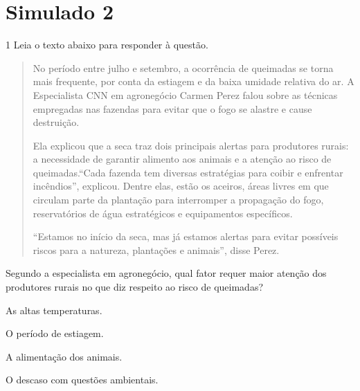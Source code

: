 \pagebreak

\section*{Simulado 2}

\num{1} Leia o texto abaixo para responder à questão.

\begin{quote}

No período entre julho e setembro, a ocorrência de queimadas se torna
mais frequente, por conta da estiagem e da baixa umidade relativa do ar.
A Especialista CNN em agronegócio Carmen Perez falou sobre as técnicas
empregadas nas fazendas para evitar que o fogo se alastre e cause
destruição.

Ela explicou que a seca traz dois principais alertas para produtores
rurais: a necessidade de garantir alimento aos animais e a atenção ao
risco de queimadas.``Cada fazenda tem diversas estratégias para coibir e
enfrentar incêndios'', explicou. Dentre elas, estão os aceiros, áreas
livres em que circulam parte da plantação para interromper a propagação do
fogo, reservatórios de água estratégicos e equipamentos específicos.

``Estamos no início da seca, mas já estamos alertas para evitar
possíveis riscos para a natureza, plantações e animais'', disse Perez.

\end{quote}


Segundo a especialista em agronegócio, qual fator requer maior atenção
dos produtores rurais no que diz respeito ao risco de queimadas?

\begin{escolha}
    
    \item As altas temperaturas.
    
    \item O período de estiagem.
    
    \item A alimentação dos animais.
    
    \item O descaso com questões ambientais.

\end{escolha}
  
